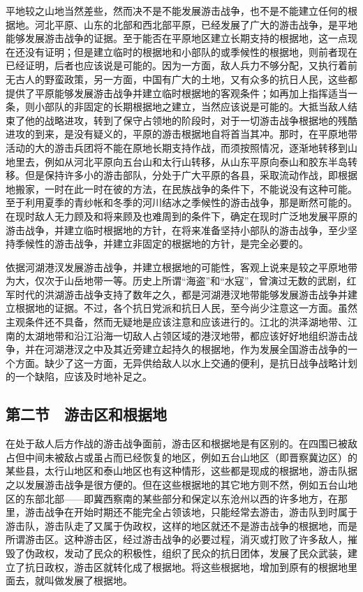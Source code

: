 平地较之山地当然差些，然而决不是不能发展游击战争，也不是不能建立任何的根据地。河北平原、山东的北部和西北部平原，已经发展了广大的游击战争，是平地能够发展游击战争的证据。至于能否在平原地区建立长期支持的根据地，这一点现在还没有证明；但是建立临时的根据地和小部队的或季候性的根据地，则前者现在已经证明，后者也应该说是可能的。因为一方面，敌人兵力不够分配，又执行着前无古人的野蛮政策，另一方面，中国有广大的土地，又有众多的抗日人民，这些都提供了平原能够发展游击战争并建立临时根据地的客观条件；如再加上指挥适当一条，则小部队的非固定的长期根据地之建立，当然应该说是可能的。大抵当敌人结束了他的战略进攻，转到了保守占领地的阶段时，对于一切游击战争根据地的残酷进攻的到来，是没有疑义的，平原的游击根据地自将首当其冲。那时，在平原地带活动的大的游击兵团将不能在原地长期支持作战，而须按照情况，逐渐地转移到山地里去，例如从河北平原向五台山和太行山转移，从山东平原向泰山和胶东半岛转移。但是保持许多小的游击部队，分处于广大平原的各县，采取流动作战，即根据地搬家，一时在此一时在彼的方法，在民族战争的条件下，不能说没有这种可能。至于利用夏季的青纱帐和冬季的河川结冰之季候性的游击战争，那是断然可能的。在现时敌人无力顾及和将来顾及也难周到的条件下，确定在现时广泛地发展平原的游击战争，并建立临时根据地的方针，在将来准备坚持小部队的游击战争，至少坚持季候性的游击战争，并建立非固定的根据地的方针，是完全必要的。

依据河湖港汊发展游击战争，并建立根据地的可能性，客观上说来是较之平原地带为大，仅次于山岳地带一等。历史上所谓“海盗”和“水寇”，曾演过无数的武剧，红军时代的洪湖游击战争支持了数年之久，都是河湖港汊地带能够发展游击战争并建立根据地的证据。不过，各个抗日党派和抗日人民，至今尚少注意这一方面。虽然主观条件还不具备，然而无疑地是应该注意和应该进行的。江北的洪泽湖地带、江南的太湖地带和沿江沿海一切敌人占领区域的港汊地带，都应该好好地组织游击战争，并在河湖港汊之中及其近旁建立起持久的根据地，作为发展全国游击战争的一个方面。缺少了这一方面，无异供给敌人以水上交通的便利，是抗日战争战略计划的一个缺陷，应该及时地补足之。

\subsection{第二节　游击区和根据地}

在处于敌人后方作战的游击战争面前，游击区和根据地是有区别的。在四围已被敌占但中间未被敌占或虽占而已经恢复的地区，例如五台山地区（即晋察冀边区）的某些县，太行山地区和泰山地区也有这种情形，这些都是现成的根据地，游击队据之以发展游击战争是很方便的。但在这些根据地的其它地方则不然，例如五台山地区的东部北部——即冀西察南的某些部分和保定以东沧州以西的许多地方，在那里，游击战争在开始时期还不能完全占领该地，只能经常去游击，游击队到时属于游击队，游击队走了又属于伪政权，这样的地区就还不是游击战争的根据地，而是所谓游击区。这种游击区，经过游击战争的必要过程，消灭或打败了许多敌人，摧毁了伪政权，发动了民众的积极性，组织了民众的抗日团体，发展了民众武装，建立了抗日政权，游击区就转化成了根据地。将这些根据地，增加到原有的根据地里面去，就叫做发展了根据地。

